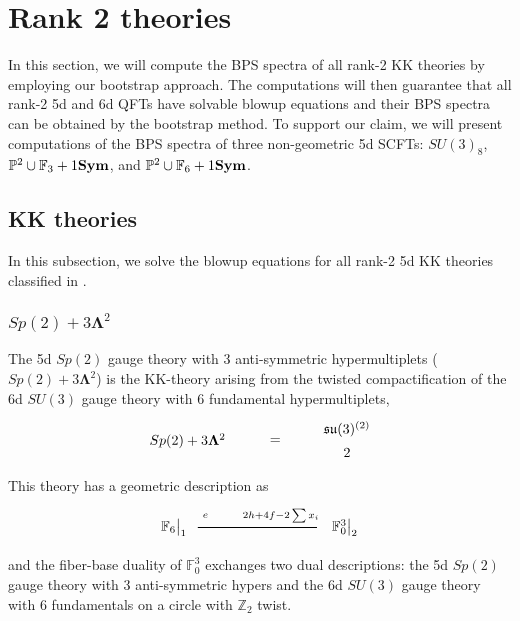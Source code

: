 \section{Rank 2 theories}\label{sec:rank2 theories}

In this section, we will compute the BPS spectra of all rank-2 KK theories by employing our bootstrap approach. The computations will then guarantee that all rank-2 5d and 6d QFTs have solvable blowup equations and their BPS spectra can be obtained by the bootstrap method. To support our claim, we will present computations of the BPS spectra of three non-geometric 5d SCFTs: $SU(3)_8$, $\mathbb{P}^2 \cup \mathbb{F}_3+1{\bf Sym}$, and $\mathbb{P}^2 \cup \mathbb{F}_6+1{\bf Sym}$.


\subsection{KK theories}
In this subsection, we solve the blowup equations for all rank-2 5d KK theories classified in \cite{Jefferson:2017ahm,Jefferson:2018irk,Bhardwaj:2019fzv}.


\subsubsection{\texorpdfstring{$Sp(2)+3\mathbf{\Lambda}^2$}{Sp(2) + 3AS}}
 
The 5d $ Sp(2)$ gauge theory with 3 anti-symmetric hypermultiplets ($Sp(2)+3\mathbf{\Lambda}^2$) is the KK-theory arising from the twisted compactification of the 6d $ SU(3) $ gauge theory with 6 fundamental hypermultiplets,
\begin{align}
\begin{tikzpicture}
\draw (0, 0) node {$ Sp(2) + 3\mathbf{\Lambda}^2 $}
(2.2, 0) node {$ = $}
(4, 0.3) node {$ \mathfrak{su}(3)^{(2)} $}
(4, -0.3) node {$ 2 $};
\end{tikzpicture}
\end{align}
This theory has a geometric description \cite{Jefferson:2018irk} as 
\begin{align}\label{eq:Sp2_3AS_geo}
\begin{tikzpicture}
\draw[thick](-3,0)--(0,0);	
\node at(-3.6,0) {$\mathbb{F}_{6}{}\big|_1$};
\node at(-2.8,0.3) {${}_e$};
\node at(0.7,0) {$\mathbb{F}_{0}^{3}{}\big|_2$};
\node at(-0.9,0.3) {${}_{2h + 4f - 2\sum x_i}$};
\end{tikzpicture}
\end{align}
and the fiber-base duality of $\mathbb{F}_0^3$ exchanges two dual descriptions: the 5d $Sp(2)$ gauge theory with 3 anti-symmetric hypers and the 6d $SU(3)$ gauge theory with 6 fundamentals on a circle with $\mathbb{Z}_2$ twist.

